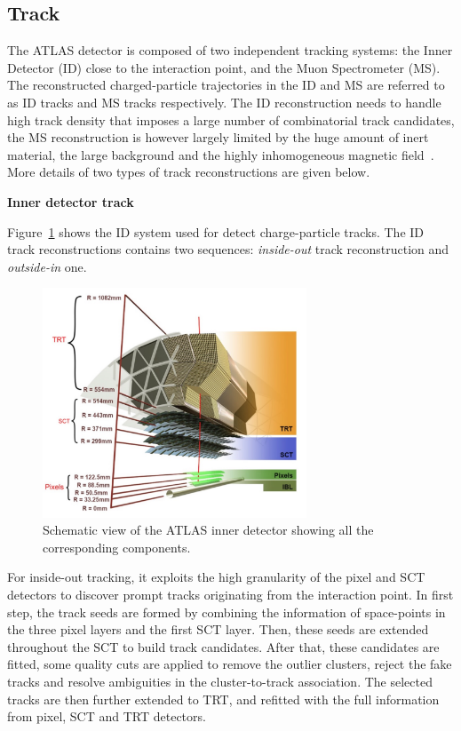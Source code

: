 \subsection{Track}
\label{sec:track}

The ATLAS detector is composed of two independent tracking systems: the Inner Detector (ID) close to the interaction point, and the Muon Spectrometer (MS).
The reconstructed charged-particle trajectories in the ID and MS are referred to as ID tracks and MS tracks respectively.
The ID reconstruction needs to handle high track density that imposes a large number of combinatorial track candidates, 
the MS reconstruction is however largely limited by the huge amount of inert material, the large background and the highly inhomogeneous magnetic field~\cite{Cornelissen:1020106}.
More details of two types of track reconstructions are given below.

\textbf{Inner detector track}

Figure~\ref{fig:track_ID} shows the ID system used for detect charge-particle tracks.
The ID track reconstructions contains two sequences: \textit{inside-out} track reconstruction and \textit{outside-in} one.
\begin{figure}[!htb]
  \centering
  \includegraphics[width=0.7\textwidth]{figures/Simulation/track_ID.png}
  \caption{Schematic view of the ATLAS inner detector showing all the corresponding components.}
  \label{fig:track_ID}
\end{figure}

For inside-out tracking, it exploits the high granularity of the pixel and SCT detectors to discover prompt tracks originating from the interaction point.
In first step, the track seeds are formed by combining the information of space-points in the three pixel layers and the first SCT layer.
Then, these seeds are extended throughout the SCT to build track candidates.
After that, these candidates are fitted, some quality cuts are applied to remove the outlier clusters, reject the fake tracks and resolve ambiguities in the cluster-to-track association.
The selected tracks are then further extended to TRT, and refitted with the full information from pixel, SCT and TRT detectors.

